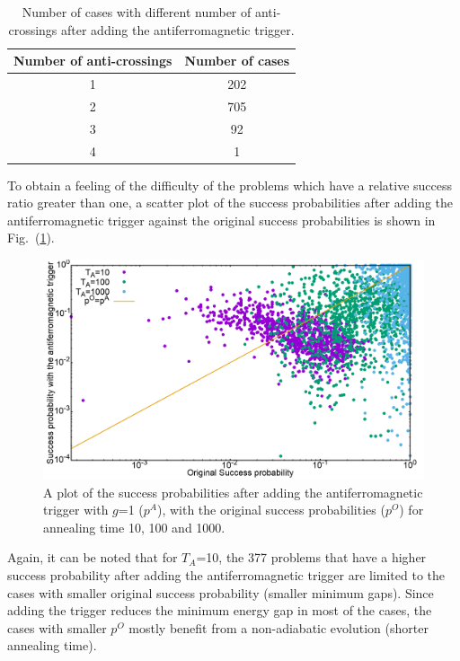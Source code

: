 \documentclass[../main.tex]{subfiles}
\begin{document}
\begin{table}[H]
\centering
\renewcommand{\arraystretch}{1.5}
\begin{tabular}{|c|c|}
\hline 
Number of anti-crossings & Number of cases  \\ 
\hline 
1 & 202 \\ 
\hline 
2 & 705 \\ 
\hline 
3 & 92 \\ 
\hline 
4 & 1 \\ 
\hline 
\end{tabular} 
\caption{Number of cases with different number of anti-crossings after adding the antiferromagnetic trigger.}
\label{tab:a4}

\end{table}
To obtain a feeling of the difficulty of the problems which have a relative success ratio greater than one, a scatter plot of the success probabilities after adding the antiferromagnetic trigger against the original success probabilities is shown in Fig.~(\ref{fig:a22}).


\begin{figure}
\centering 
\includegraphics[scale=0.24]{ProbScat_g1.png}
\caption{A plot of the success probabilities after adding the antiferromagnetic trigger with $g$=1 ($p^A$), with the original success probabilities ($p^O$) for annealing time 10, 100 and 1000.}
\label{fig:a22}
\end{figure}

Again, it can be noted that for $T_A$=10, the 377 problems that have a higher success probability after adding the antiferromagnetic trigger are limited to the cases with smaller original success probability (smaller minimum gaps). Since adding the trigger reduces the minimum energy gap in most of the cases, the cases with smaller $p^O$ mostly benefit from a non-adiabatic evolution (shorter annealing time).\\
\end{document}
